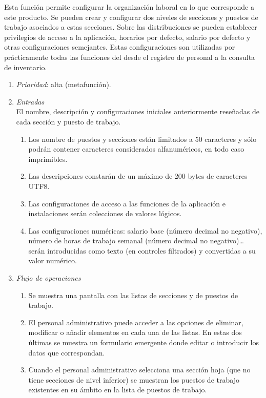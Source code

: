 
 \label{fun:orglaboral}
	Esta función permite configurar la organización laboral en lo que corresponde a este producto. Se pueden crear y configurar dos niveles de secciones y puestos de trabajo asociados a estas secciones. Sobre las distribuciones se pueden establecer privilegios de acceso a la aplicación, horarios por defecto, salario por defecto y otras configuraciones semejantes. Estas configuraciones son utilizadas por prácticamente todas las funciones del \software desde el registro de personal a la consulta de inventario.

	\begin{enumerate}
		\item \textit{Prioridad}: alta (metafunción).
		\item \textit{Entradas}\\
			El nombre, descripción y configuraciones iniciales anteriormente reseñadas de cada sección y puesto de trabajo.
			\begin{enumerate}
				\item Los nombre de puestos y secciones están limitados a 50 caracteres y sólo podrán contener caracteres considerados alfanuméricos, en todo caso imprimibles.
				\item Las descripciones constarán de un máximo de 200 bytes de caracteres \gls{UTF8}.
				\item Las configuraciones de acceso a las funciones de la aplicación e instalaciones serán colecciones de valores lógicos.
				\item Las configuraciones numéricas: salario base (número decimal no negativo), número de horas de trabajo semanal (número decimal no negativo)\dots{} serán introducidas como texto (en controles filtrados) y convertidas a su valor numérico.
			\end{enumerate}
		\item \textit{Flujo de operaciones}
			\begin{enumerate}
				\item Se muestra una pantalla con las listas de secciones y de puestos de trabajo.
				\item El personal administrativo puede acceder a las opciones de eliminar, modificar o añadir elementos en cada una de las listas. En estas dos últimas se muestra un formulario emergente donde editar o introducir los datos que correspondan.
				\item Cuando el personal administrativo selecciona una sección hoja (que no tiene secciones de nivel inferior) se muestran los puestos de trabajo existentes en su ámbito en la lista de puestos de trabajo.

\end{enumerate}
\end{enumerate}
